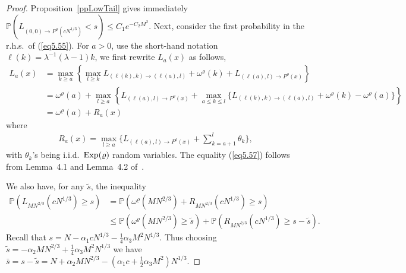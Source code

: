 \documentclass[12pt,a4paper]{article}
\numberwithin{equation}{section}
\newcommand{\Pb}{\mathbb{P}}
\begin{document}
\begin{proof}
Proposition~\ref{ppLowTail} gives immediately $\Pb\left(L_{(0,0)\to P^\varrho(c N^{1/3})}<s\right)\leq C_1 e^{-C_2 M^2}$. Next, consider the first probability in the r.h.s.~of (\ref{eq5.55}). For $a>0$, use the short-hand notation $\ell(k)=\lambda^{-1}(\lambda-1) k$, we first rewrite $L_a(x)$ as follows,
\begin{equation}\label{eq5.56}
\begin{aligned}
L_{a}(x)&=\max_{k\geq a} \left\{\max_{l\geq k}L_{(\ell(k),k)\to (\ell(a),l)}+\omega^\varrho(k)+L_{(\ell(a),l)\to P^\varrho(x)}\right\} \\
&=\omega^\varrho(a)+\max_{l\geq a} \left\{L_{(\ell(a),l)\to P^\varrho(x)} + \max_{a\leq k \leq l}\{L_{(\ell(k),k)\to (\ell(a),l)}+\omega^\varrho(k)-\omega^\varrho(a)\}\right\}\\
&=\omega^\varrho(a)+ R_a(x)
\end{aligned}
\end{equation}
where
\begin{equation}\label{eq5.57}
\begin{aligned}
R_a(x)=\max_{l\geq a} \bigg\{L_{(\ell(a),l)\to P^\varrho(x)} + \sum_{k=a+1}^l \theta_k\bigg\},
\end{aligned}
\end{equation}
with $\theta_k$'s being i.i.d.\ ${\rm Exp}(\varrho)$ random variables. The equality (\ref{eq5.57}) follows from Lemma~4.1 and Lemma~4.2 of~\cite{BCS06}.

We also have, for any $\tilde s$, the inequality
\begin{equation}\label{eq4.58}
\begin{aligned}
\Pb\left(L_{M N^{2/3}}(c N^{1/3})\geq s\right) &=\Pb\left(\omega^\varrho(M N^{2/3})+R_{M N^{2/3}}(c N^{1/3})\geq s\right) \\
&\leq \Pb\left(\omega^\varrho(M N^{2/3})\geq \tilde s\right) +\Pb\left(R_{M N^{2/3}}(c N^{1/3})\geq s-\tilde s\right).
\end{aligned}
\end{equation}
Recall that $s=N-\alpha_1 c N^{1/3}-\frac14\alpha_3 M^2 N^{1/3}$. Thus choosing $\tilde s=-\alpha_2 M N^{2/3}+\frac14\alpha_3 M^2 N^{1/3}$ we have $\bar s=s-\tilde s = N +\alpha_2 M N^{2/3}-(\alpha_1 c+\frac12\alpha_3 M^2)N^{1/3}$.


\end{proof}
\end{document}
